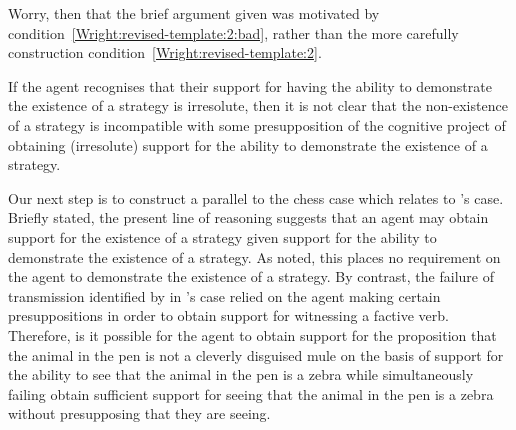 \documentclass[10pt]{article}
\begin{document}
\begin{note}
  Worry, then that the brief argument given was motivated by condition~\ref{Wright:revised-template:2:bad}, rather than the more carefully construction condition~\ref{Wright:revised-template:2}.

  If the agent recognises that their support for having the ability to demonstrate the existence of a strategy is irresolute, then it is not clear that the non-existence of a strategy is incompatible with some presupposition of the cognitive project of obtaining (irresolute) support for the ability to demonstrate the existence of a strategy.

  Our next step is to construct a parallel to the chess case which relates to \citeauthor{Dretske:2005vy}'s case.
  Briefly stated, the present line of reasoning suggests that an agent may obtain support for the existence of a strategy given support for the ability to demonstrate the existence of a strategy.
  As noted, this places no requirement on the agent to demonstrate the existence of a strategy.
  By contrast, the failure of transmission identified by \citeauthor{Wright:2011wn} in \citeauthor{Dretske:2005vy}'s case relied on the agent making certain presuppositions in order to obtain support for witnessing a factive verb.
  Therefore, is it possible for the agent to obtain support for the proposition that the animal in the pen is not a cleverly disguised mule on the basis of support for the ability to see that the animal in the pen is a zebra while simultaneously failing obtain sufficient support for seeing that the animal in the pen is a zebra without presupposing that they are seeing.
\end{note}
\end{document}
